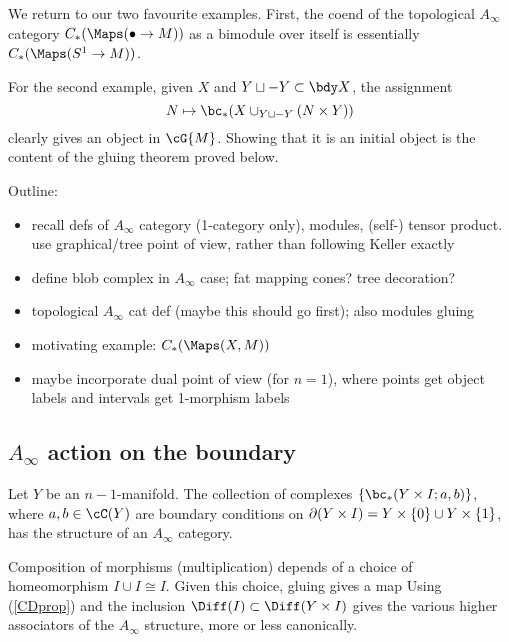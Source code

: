 We return to our two favourite examples. First, the coend of the topological $A_\infty$ category $C_*(\Maps(\bullet \to M))$ as a bimodule over itself
is essentially $C_*(\Maps(S^1 \to M))$. \todo{}

For the second example, given $X$ and $Y\du -Y \sub \bdy X$, the assignment
$$N \mapsto \bc_*(X \cup_{Y\du -Y} (N\times Y))$$ clearly gives an object in $\cG{M}$.
Showing that it is an initial object is the content of the gluing theorem proved below.



\bigskip

Outline:
\begin{itemize}
\item recall defs of $A_\infty$ category (1-category only), modules, (self-) tensor product.
use graphical/tree point of view, rather than following Keller exactly
\item define blob complex in $A_\infty$ case; fat mapping cones?  tree decoration?
\item topological $A_\infty$ cat def (maybe this should go first); also modules gluing
\item motivating example: $C_*(\Maps(X, M))$
\item maybe incorporate dual point of view (for $n=1$), where points get
object labels and intervals get 1-morphism labels
\end{itemize}


\subsection{$A_\infty$ action on the boundary}
\label{sec:boundary-action}%
Let $Y$ be an $n{-}1$-manifold.
The collection of complexes $\{\bc_*(Y\times I; a, b)\}$, where $a, b \in \cC(Y)$ are boundary
conditions on $\partial(Y\times I) = Y\times \{0\} \cup Y\times\{1\}$, has the structure
of an $A_\infty$ category.

Composition of morphisms (multiplication) depends of a choice of homeomorphism
$I\cup I \cong I$.  Given this choice, gluing gives a map
Using (\ref{CDprop}) and the inclusion $\Diff(I) \sub \Diff(Y\times I)$ gives the various
higher associators of the $A_\infty$ structure, more or less canonically.

